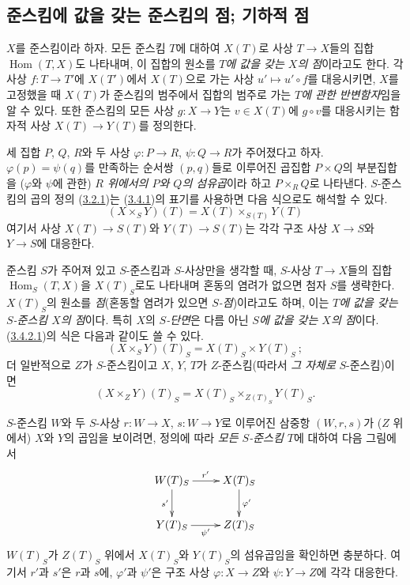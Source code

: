 \subsection{준스킴에 값을 갖는 준스킴의 점; 기하적 점}
\label{subsection:I.3.4-ko}

\begin{env}[3.4.1]
\label{I.3.4.1-ko}
$X$를 준스킴이라 하자. 모든 준스킴 $T$에 대하여 $X(T)$로
사상 $T\to X$들의 집합 $\operatorname{Hom}(T,X)$도 나타내며, 이 집합의
원소를 \emph{$T$에 값을 갖는 $X$의 점}이라고도 한다. 각 사상
$f:T\to T'$에 $X(T')$에서 $X(T)$으로 가는 사상
$u'\mapsto u'\circ f$를 대응시키면, $X$를 고정했을 때 $X(T)$가
준스킴의 범주에서 집합의 범주로 가는 \emph{$T$에 관한 반변함자}임을
알 수 있다. 또한 준스킴의 모든 사상 $g:X\to Y$는 $v\in X(T)$에
$g\circ v$를 대응시키는 함자적 사상 $X(T)\to Y(T)$를 정의한다.
\end{env}

\begin{env}[3.4.2]
\label{I.3.4.2-ko}
세 집합 $P$, $Q$, $R$와 두 사상 $\varphi:P\to R$, $\psi:Q\to R$가
주어졌다고 하자. $\varphi(p)=\psi(q)$를 만족하는 순서쌍 $(p,q)$들로
이루어진 곱집합 $P\times Q$의 부분집합을 ($\varphi$와 $\psi$에 관한)
\emph{$R$ 위에서의 $P$와 $Q$의 섬유곱}이라 하고
$P\times_R Q$로 나타낸다. $S$-준스킴의 곱의 정의
(\hyperref[I.3.2.1-ko]{3.2.1})는
(\hyperref[I.3.4.1-ko]{3.4.1})의 표기를 사용하면 다음 식으로도
해석할 수 있다.
\label{I.3.4.2.1-ko}
\[
  (X\times_S Y)(T)=X(T)\times_{S(T)}Y(T)
  \tag{3.4.2.1}
\]
여기서 사상 $X(T)\to S(T)$와 $Y(T)\to S(T)$는 각각 구조 사상
$X\to S$와 $Y\to S$에 대응한다.
\end{env}

\begin{env}[3.4.3]
\label{I.3.4.3-ko}
준스킴 $S$가 주어져 있고 $S$-준스킴과 $S$-사상만을 생각할 때,
$S$-사상 $T\to X$들의 집합 $\operatorname{Hom}_S(T,X)$을
$X(T)_S$로도 나타내며 혼동의 염려가 없으면 첨자 $S$를 생략한다.
$X(T)_S$의 원소를 \emph{점}(혼동할 염려가 있으면 \emph{$S$-점})이라고도
하며, 이는 \emph{$T$에 값을 갖는 $S$-준스킴 $X$의 점}이다. 특히 $X$의
\emph{$S$-단면}은 다름 아닌 \emph{$S$에 값을 갖는 $X$의 점}이다.
(\hyperref[I.3.4.2.1-ko]{3.4.2.1})의 식은 다음과 같이도 쓸 수 있다.
\label{I.3.4.3.1-ko}
\[
  (X\times_S Y)(T)_S=X(T)_S\times Y(T)_S~;
  \tag{3.4.3.1}
\]
더 일반적으로 $Z$가 $S$-준스킴이고 $X$, $Y$, $T$가
$Z$-준스킴(따라서 \emph{그 자체로} $S$-준스킴)이면
\label{I.3.4.3.2-ko}
\[
  (X\times_Z Y)(T)_S=X(T)_S\times_{Z(T)_S}Y(T)_S.
  \tag{3.4.3.2}
\]

$S$-준스킴 $W$와 두 $S$-사상 $r:W\to X$, $s:W\to Y$로 이루어진
삼중항 $(W,r,s)$가 ($Z$ 위에서) $X$와 $Y$의 곱임을 보이려면,
정의에 따라 \emph{모든 $S$-준스킴 $T$}에 대하여 다음 그림에서
\label{I.3.4.3.product-diagram-ko}
\[
  \xymatrix{
    W(T)_S\ar[r]^{r'}\ar[d]_{s'} & X(T)_S\ar[d]^{\varphi'}\\
    Y(T)_S\ar[r]_{\psi'} & Z(T)_S
  }
\]
$W(T)_S$가 $Z(T)_S$ 위에서 $X(T)_S$와 $Y(T)_S$의 섬유곱임을
확인하면 충분하다. 여기서 $r'$과 $s'$은 $r$과 $s$에,
$\varphi'$과 $\psi'$은 구조 사상 $\varphi:X\to Z$와
$\psi:Y\to Z$에 각각 대응한다.
\end{env}

